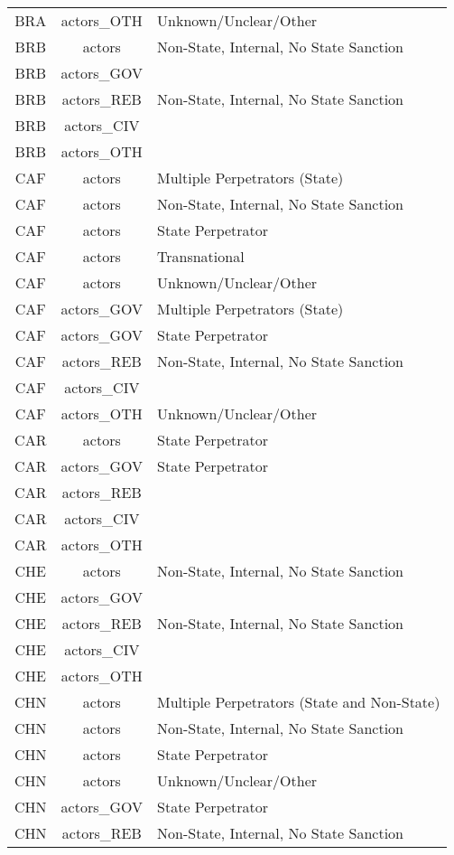 \documentclass[12pt]{article}
\begin{document}
\begin{center}
\begin{longtable}{|c|c|p{10cm}|}
  BRA & actors\_OTH & Unknown/Unclear/Other \\ 
  BRB & actors & Non-State, Internal, No State Sanction \\ 
  BRB & actors\_GOV &  \\ 
  BRB & actors\_REB & Non-State, Internal, No State Sanction \\ 
  BRB & actors\_CIV &  \\ 
  BRB & actors\_OTH &  \\ 
  CAF & actors & Multiple Perpetrators (State) \\ 
  CAF & actors & Non-State, Internal, No State Sanction \\ 
  CAF & actors & State Perpetrator \\ 
  CAF & actors & Transnational \\ 
  CAF & actors & Unknown/Unclear/Other \\ 
  CAF & actors\_GOV & Multiple Perpetrators (State) \\ 
  CAF & actors\_GOV & State Perpetrator \\ 
  CAF & actors\_REB & Non-State, Internal, No State Sanction \\ 
  CAF & actors\_CIV &  \\ 
  CAF & actors\_OTH & Unknown/Unclear/Other \\ 
  CAR & actors & State Perpetrator \\ 
  CAR & actors\_GOV & State Perpetrator \\ 
  CAR & actors\_REB &  \\ 
  CAR & actors\_CIV &  \\ 
  CAR & actors\_OTH &  \\ 
  CHE & actors & Non-State, Internal, No State Sanction \\ 
  CHE & actors\_GOV &  \\ 
  CHE & actors\_REB & Non-State, Internal, No State Sanction \\ 
  CHE & actors\_CIV &  \\ 
  CHE & actors\_OTH &  \\ 
  CHN & actors & Multiple Perpetrators (State and Non-State) \\ 
  CHN & actors & Non-State, Internal, No State Sanction \\ 
  CHN & actors & State Perpetrator \\ 
  CHN & actors & Unknown/Unclear/Other \\ 
  CHN & actors\_GOV & State Perpetrator \\ 
  CHN & actors\_REB & Non-State, Internal, No State Sanction \\ 

\end{longtable}
\end{center}
\end{document}
